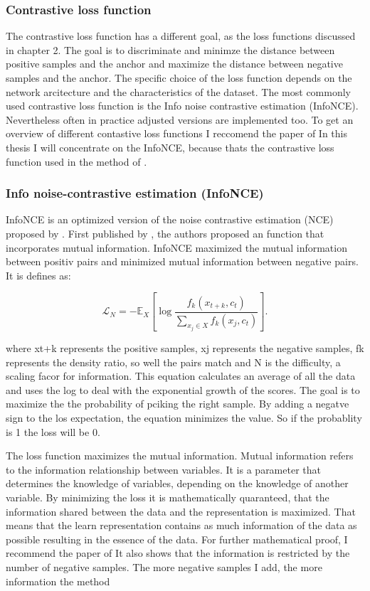 \subsubsection*{Contrastive loss function}
The contrastive loss function has a different goal, as the loss functions discussed in chapter 2.
The goal is to discriminate and minimze the distance between positive samples and the anchor and maximize the distance between negative samples and the anchor.
The specific choice of the loss function depends on the network arcitecture and the characteristics of the dataset. 
The most commonly used contrastive loss function  is the Info noise contrastive estimation (InfoNCE).
Nevertheless often in practice adjusted versions are implemented too.
To get an overview of different contastive loss functions I reccomend the paper of 
In this thesis I will concentrate on the InfoNCE, because thats the contrastive loss function used in the method of \citet{shenkar2022anomaly}.


\subsubsection*{Info noise-contrastive estimation (InfoNCE)}
InfoNCE is an optimized version of the noise contrastive estimation (NCE) proposed by \citet{gutmann2010noise}.
First published by \citet{oord2018representation}, the authors proposed an function that incorporates mutual information. 
InfoNCE maximized the mutual information between positiv pairs and minimized mutual information between negative pairs.
It is defines as: 


\begin{equation}
    \mathcal{L}_{N} = -\mathbb{E}_{X} \left[ \log \frac{f_k(x_{t+k}, c_t)}{\sum_{x_j \in X} f_k(x_j, c_t)} \right] .
\end{equation}


where xt+k represents the positive samples, xj represents the negative samples, fk represents the density ratio, so well the pairs match and N is the difficulty, a scaling facor for information.
This equation calculates an average of all the data and uses the log to deal with the exponential growth of the scores. 
The goal is to maximize the the probability of pciking the right sample. 
By adding a negatve sign to the los expectation, the equation minimizes the value. 
So if the probablity is 1 the loss will be 0.


The loss function maximizes the mutual information.
Mutual information refers to the information relationship between variables. 
It is a parameter that determines the knowledge of variables, depending on the knowledge of another variable. 
By minimizing the loss it is mathematically quaranteed, that the information shared between the data and the representation is maximized.
That means that the learn representation contains as much information of the data as possible resulting in the essence of the data.
For further mathematical proof, I recommend the paper of \citet{oord2018representation}
It also shows that the information is restricted by the number of negative samples. 
The more negative samples I add, the more information the method


